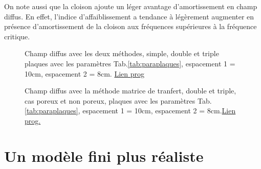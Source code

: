 \documentclass[12pt,foolscap]{report}
\begin{document}
	On note aussi que la cloison ajoute un léger avantage d'amortissement en champ diffus. En effet, l'indice d'affaiblissement a tendance à légèrement augmenter en présence d'amortissement de la cloison aux fréquences supérieures à la fréquence critique. \\
	\begin{figure}[h]
		\begin{minipage}[c]{.45\linewidth}
			\begin{center}
				\caption{Champ diffus avec les deux méthodes, simple, double et triple plaques avec les paramètres Tab.\ref{tab:paraplaques}, espacement 1 = 10cm, espacement 2 = 8cm. \href{https://github.com/Nuopel/Encoffrement/blob/master/Programme/Champ_diffu.m}{Lien prog}}
				\label{diffuscompall}
			\end{center}
		\end{minipage}
		\hfill
		\begin{minipage}[c]{.45\linewidth}
			\begin{center}
				\caption{Champ diffus avec la méthode matrice de tranfert, double et triple, cas poreux et non poreux, plaques avec les paramètres Tab. \ref{tab:paraplaques}, espacement 1 = 10cm, espacement 2 = 8cm.\href{https://github.com/Nuopel/Encoffrement/blob/master/Programme/Champ_diffu_TransMat.m}{Lien prog.}} 
				\label{diffuscompporeux}
			\end{center}
		\end{minipage}
	\end{figure}
	
	\section{Un modèle fini plus réaliste}
	
\end{document}
